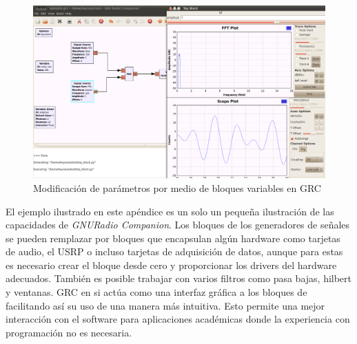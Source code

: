 \begin{figure}[htp]
  \centering
  \includegraphics[width=5.5in]{figs/grc9}
  \vspace{0.1in}
  \caption{Modificaci\'on de par\'ametros por medio de bloques variables en GRC}
  \label{fig:vargrc}
\end{figure}

El ejemplo ilustrado en este ap\'endice es un solo un peque\~na ilustraci\'on de las capacidades de
\emph{GNURadio Companion}. Los bloques de los generadores de se\~nales se pueden remplazar por
bloques que encapsulan alg\'un hardware como tarjetas de audio, el USRP o incluso tarjetas de
adquisici\'on de datos, aunque para estas es necesario crear el bloque desde cero y proporcionar los
drivers del hardware adecuados. Tambi\'en es posible trabajar con varios filtros como pasa bajas,
hilbert y ventanas. GRC en si act\'ua como una interfaz gr\'afica a los bloques de \gnuradio
facilitando as\'i su uso de una manera m\'as intuitiva. Esto permite una mejor interacci\'on con el
software para aplicaciones acad\'emicas donde la experiencia con programaci\'on no es necesaria.
